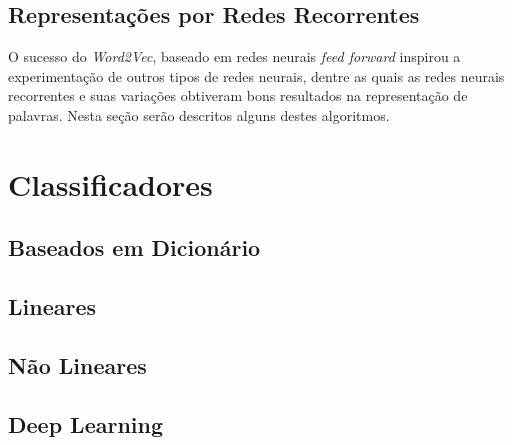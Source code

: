 \subsection{Representações por Redes Recorrentes}

O sucesso do \textit{Word2Vec}, baseado em redes neurais \textit{feed forward}
inspirou a experimentação de outros tipos de redes neurais, dentre as quais as
redes neurais recorrentes e suas variações obtiveram bons resultados na
representação de palavras.
Nesta seção serão descritos alguns destes algoritmos.


\section{Classificadores}
\subsection{Baseados em Dicionário} \label{sec:dictionary}
\subsection{Lineares}
\subsection{Não Lineares}
\subsection{Deep Learning}

